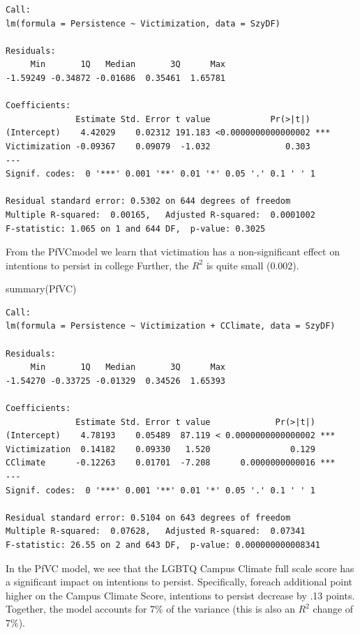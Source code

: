 \documentclass[
  english,
]{book}
\newenvironment{Shaded}{\begin{snugshade}}{\end{snugshade}}
\newcommand{\FunctionTok}[1]{\textcolor[rgb]{0.00,0.00,0.00}{#1}}
\newcommand{\NormalTok}[1]{#1}
\begin{document}
\begin{verbatim}
Call:
lm(formula = Persistence ~ Victimization, data = SzyDF)

Residuals:
     Min       1Q   Median       3Q      Max 
-1.59249 -0.34872 -0.01686  0.35461  1.65781 

Coefficients:
              Estimate Std. Error t value            Pr(>|t|)    
(Intercept)    4.42029    0.02312 191.183 <0.0000000000000002 ***
Victimization -0.09367    0.09079  -1.032               0.303    
---
Signif. codes:  0 '***' 0.001 '**' 0.01 '*' 0.05 '.' 0.1 ' ' 1

Residual standard error: 0.5302 on 644 degrees of freedom
Multiple R-squared:  0.00165,   Adjusted R-squared:  0.0001002 
F-statistic: 1.065 on 1 and 644 DF,  p-value: 0.3025
\end{verbatim}

From the PfVCmodel we learn that victimation has a non-significant effect on intentions to persist in college Further, the \(R^2\) is quite small (0.002).

\begin{Shaded}
\begin{Highlighting}[]
\FunctionTok{summary}\NormalTok{(PfVC)}
\end{Highlighting}
\end{Shaded}

\begin{verbatim}
Call:
lm(formula = Persistence ~ Victimization + CClimate, data = SzyDF)

Residuals:
     Min       1Q   Median       3Q      Max 
-1.54270 -0.33725 -0.01329  0.34526  1.65393 

Coefficients:
              Estimate Std. Error t value             Pr(>|t|)    
(Intercept)    4.78193    0.05489  87.119 < 0.0000000000000002 ***
Victimization  0.14182    0.09330   1.520                0.129    
CClimate      -0.12263    0.01701  -7.208      0.0000000000016 ***
---
Signif. codes:  0 '***' 0.001 '**' 0.01 '*' 0.05 '.' 0.1 ' ' 1

Residual standard error: 0.5104 on 643 degrees of freedom
Multiple R-squared:  0.07628,   Adjusted R-squared:  0.07341 
F-statistic: 26.55 on 2 and 643 DF,  p-value: 0.000000000008341
\end{verbatim}

In the PfVC model, we see that the LGBTQ Campus Climate full scale score has a significant impact on intentions to persist. Specifically, foreach additional point higher on the Campus Climate Score, intentions to persist decrease by .13 points. Together, the model accounts for 7\% of the variance (this is also an \(R^2\) change of 7\%).
\end{document}
